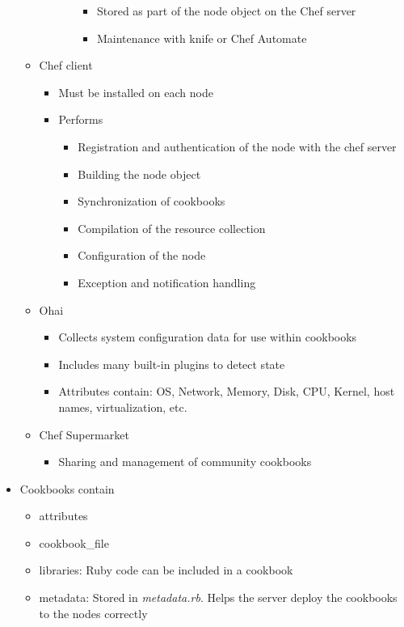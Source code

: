 \begin{itemize}
\begin{itemize}
\begin{itemize}
\begin{itemize}
\begin{itemize}
					\item Stored as part of the node object on the Chef server
					\item Maintenance with knife or Chef Automate
				\end{itemize}
			\end{itemize}
		\end{itemize}
		\item Chef client
		\begin{itemize}
			\item Must be installed on each node
			\item Performs
			\begin{itemize}
				\item Registration and authentication of the node with the chef server
				\item Building the node object
				\item Synchronization of cookbooks
				\item Compilation of the resource collection
				\item Configuration of the node
				\item Exception and notification handling
			\end{itemize}
		\end{itemize}
		\item Ohai
		\begin{itemize}
			\item Collects system configuration data for use within cookbooks
			\item Includes many built-in plugins to detect state
			\item Attributes contain: OS, Network, Memory, Disk, CPU, Kernel, host names, virtualization, etc.
		\end{itemize}
		\item Chef Supermarket
		\begin{itemize}
			\item Sharing and management of community cookbooks
		\end{itemize}
	\end{itemize}
	\item Cookbooks contain
	\begin{itemize}
		\item attributes
		\item cookbook\_file
		\item libraries: Ruby code can be included in a cookbook
		\item metadata: Stored in \textit{metadata.rb}. Helps the server deploy the cookbooks to the nodes correctly

\end{itemize}
\end{itemize}
